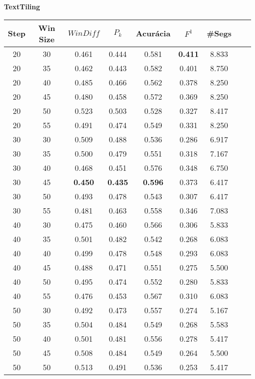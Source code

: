 
\center
\textbf{TextTiling}  
\begin{longtable}[c]{|c|c|c|c|c|c|c|c|c|} 
\hline 
 Step & Win Size & $WinDiff$ & $P_k$ & Acurácia & $F^1$ & \#Segs\\ \hline 
 20 & 30 & 0.461 & 0.444 & 0.581 & \cellcolor{gray!20} \textbf{0.411} & 8.833  \\ \hline 
 20 & 35 & 0.462 & 0.443 & 0.582 & 0.401 & 8.750  \\ \hline 
 20 & 40 & 0.485 & 0.466 & 0.562 & 0.378 & 8.250  \\ \hline 
 20 & 45 & 0.480 & 0.458 & 0.572 & 0.369 & 8.250  \\ \hline 
 20 & 50 & 0.523 & 0.503 & 0.528 & 0.327 & 8.417  \\ \hline 
 20 & 55 & 0.491 & 0.474 & 0.549 & 0.331 & 8.250  \\ \hline 
 30 & 30 & 0.509 & 0.488 & 0.536 & 0.286 & 6.917  \\ \hline 
 30 & 35 & 0.500 & 0.479 & 0.551 & 0.318 & 7.167  \\ \hline 
 30 & 40 & 0.468 & 0.451 & 0.576 & 0.348 & 6.750  \\ \hline 
 30 & 45 & \cellcolor{gray!20} \textbf{0.450} & \cellcolor{gray!20} \textbf{0.435} & \cellcolor{gray!20} \textbf{0.596} & 0.373 & 6.417  \\ \hline 
 30 & 50 & 0.493 & 0.478 & 0.543 & 0.307 & 6.417  \\ \hline 
 30 & 55 & 0.481 & 0.463 & 0.558 & 0.346 & 7.083  \\ \hline 
 40 & 30 & 0.475 & 0.460 & 0.566 & 0.306 & 5.833  \\ \hline 
 40 & 35 & 0.501 & 0.482 & 0.542 & 0.268 & 6.083  \\ \hline 
 40 & 40 & 0.499 & 0.478 & 0.548 & 0.293 & 6.083  \\ \hline 
 40 & 45 & 0.488 & 0.471 & 0.551 & 0.275 & 5.500  \\ \hline 
 40 & 50 & 0.495 & 0.474 & 0.552 & 0.280 & 5.833  \\ \hline 
 40 & 55 & 0.476 & 0.453 & 0.567 & 0.310 & 6.083  \\ \hline 
 50 & 30 & 0.492 & 0.473 & 0.557 & 0.274 & 5.167  \\ \hline 
 50 & 35 & 0.504 & 0.484 & 0.549 & 0.268 & 5.583  \\ \hline 
 50 & 40 & 0.501 & 0.481 & 0.556 & 0.278 & 5.417  \\ \hline 
 50 & 45 & 0.508 & 0.484 & 0.549 & 0.264 & 5.500  \\ \hline 
 50 & 50 & 0.513 & 0.491 & 0.536 & 0.253 & 5.417  \\ \hline 

\end{longtable}
